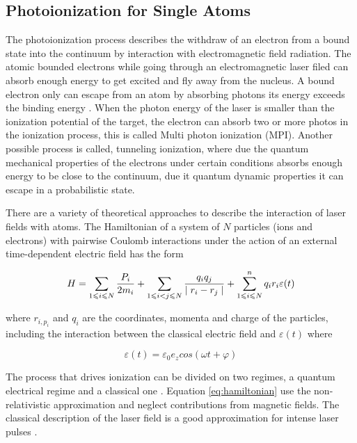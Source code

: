 \subsection{Photoionization for Single Atoms}

The photoionization process describes the withdraw of an electron from a bound state into the continuum by interaction with electromagnetic field radiation\cite{berkowitz_photoabsorption_1979}. The atomic bounded electrons while going through an electromagnetic laser filed can absorb enough energy to get excited and fly away from the nucleus. A bound electron only can escape from an atom by absorbing photons its energy exceeds the binding energy \cite{einstein_uber_1905}. When the photon energy of the laser is smaller than the ionization potential of the target, the electron can absorb two or more photos in the ionization process, this is called Multi photon ionization (MPI). Another possible process is called, tunneling ionization, where due the quantum mechanical properties of the electrons under certain conditions absorbs enough energy to be close to the continuum, due it quantum dynamic properties it can escape in a probabilistic state.

There are a variety of theoretical approaches to describe the interaction of laser fields with atoms. The Hamiltonian of a system of $N$ particles (ions and electrons) with pairwise Coulomb interactions under the action of an external time-dependent electric field has the form  \cite{mikaberidze_atomic_1981}

\begin{equation}  \label{eq:hamiltonian}
\centering
H = \displaystyle\sum_{1 \leqslant i \leqslant N}^{} \dfrac{P_{i}}{2m_{i}} + \displaystyle\sum_{1 \leqslant i < j \leqslant N}^{} \dfrac{q_{i}q_{j}}{\mid r_{i}-r_{j} \mid} + \displaystyle\sum_{1 \leqslant i \leqslant N}^{n} q_{i}r_{i}\varepsilon(t)
\end{equation}

where $ r_{i,  p_{i}} $ and $ q_{i} $ are the coordinates, momenta and charge of the particles, including the interaction between the classical electric field and $ \varepsilon(t) $ where 

\begin{equation}
\varepsilon(t) = \varepsilon_{0} e_{z}cos(\omega t + \varphi)
\end{equation}

The process that drives ionization can be divided on two regimes, a quantum electrical regime and a classical one \cite{karnakov_strong_2009}. Equation \ref{eq:hamiltonian} use the non-relativistic approximation and neglect contributions from magnetic fields. The classical description of the laser field is a good approximation for intense laser pulses \cite{gruner_femtosekundenspektroskopie_2013}.

